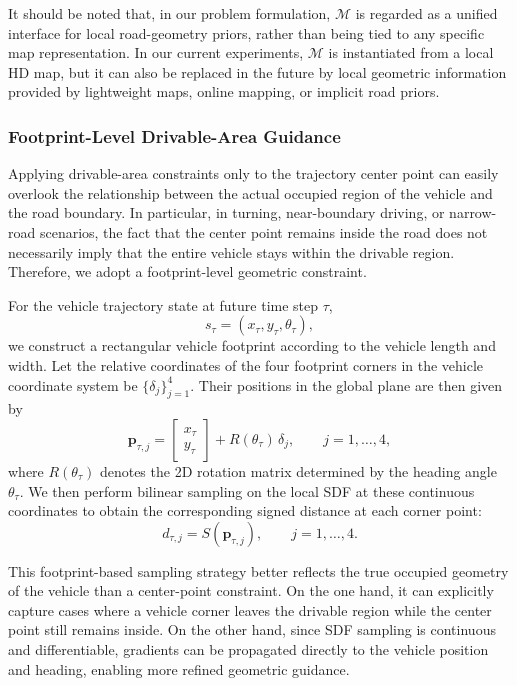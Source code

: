\documentclass[3p,times,authoryear]{elsarticle}
\begin{document}
It should be noted that, in our problem formulation, $\mathcal{M}$ is regarded as a unified interface for local road-geometry priors, rather than being tied to any specific map representation. In our current experiments, $\mathcal{M}$ is instantiated from a local HD map, but it can also be replaced in the future by local geometric information provided by lightweight maps, online mapping, or implicit road priors.

\subsubsection{Footprint-Level Drivable-Area Guidance}

Applying drivable-area constraints only to the trajectory center point can easily overlook the relationship between the actual occupied region of the vehicle and the road boundary. In particular, in turning, near-boundary driving, or narrow-road scenarios, the fact that the center point remains inside the road does not necessarily imply that the entire vehicle stays within the drivable region. Therefore, we adopt a footprint-level geometric constraint.

For the vehicle trajectory state at future time step $\tau$,
\begin{equation}
s_{\tau} = (x_{\tau}, y_{\tau}, \theta_{\tau}),
\end{equation}
we construct a rectangular vehicle footprint according to the vehicle length and width. Let the relative coordinates of the four footprint corners in the vehicle coordinate system be $\{\delta_j\}_{j=1}^{4}$. Their positions in the global plane are then given by
\begin{equation}
\mathbf{p}_{\tau,j} =
\begin{bmatrix}
 x_{\tau} \\
 y_{\tau}
\end{bmatrix}
+ R(\theta_{\tau})\,\delta_j,
\qquad j = 1, \ldots, 4,
\end{equation}
where $R(\theta_{\tau})$ denotes the 2D rotation matrix determined by the heading angle $\theta_{\tau}$. We then perform bilinear sampling on the local SDF at these continuous coordinates to obtain the corresponding signed distance at each corner point:
\begin{equation}
d_{\tau,j} = S(\mathbf{p}_{\tau,j}),
\qquad j = 1, \ldots, 4.
\end{equation}

This footprint-based sampling strategy better reflects the true occupied geometry of the vehicle than a center-point constraint. On the one hand, it can explicitly capture cases where a vehicle corner leaves the drivable region while the center point still remains inside. On the other hand, since SDF sampling is continuous and differentiable, gradients can be propagated directly to the vehicle position and heading, enabling more refined geometric guidance.
\end{document}
